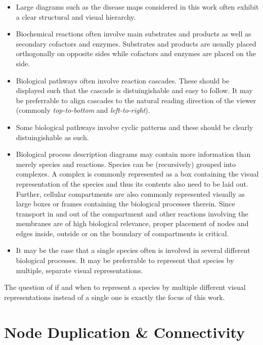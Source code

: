 \documentclass[
	fontsize=10pt, %
	twoside=true, %
	secnumdepth=1, %
  toc=indentunnumbered %
]{kaobook}
\begin{document}
\begin{itemize}
 \item Large diagrams such as the disease maps considered in this work often
   exhibit a clear structural and visual hierarchy.
 \item Biochemical reactions often involve main substrates and products as well
   as secondary cofactors and enzymes. Substrates and products are usually
   placed orthogonally on opposite sides while cofactors and enzymes are
   placed on the side.
 \item Biological pathways often involve reaction cascades. These should be
   displayed such that the cascade is distuingishable and easy to follow.
   It may be preferrable to align cascades to the natural reading direction of
   the viewer (commonly \textit{top-to-bottom} and \textit{left-to-right}).
 \item Some biological pathways involve cyclic patterns and these should be
   clearly distuingishable as such.
\item Biological process description diagrams may contain more information
  than merely species and reactions. Species can be (recursively) grouped
  into complexes. A complex is commonly represented as a box containing the
  visual representation of the species and thus its contents also need to be
  laid out. Further, cellular compartments are also commonly represented
  visually as large boxes or frames containing the biological processes
  therein. Since transport in and out of the compartment and other reactions
  involving the membranes are of high biological relevance, proper placement
  of nodes and edges inside, outside or on the boundary of compartments is critical.
\item It may be the case that a single species often is involved in several
  different biological processes. It may be preferrable to represent that
  species by multiple, separate visual representations.
\end{itemize}

The question of if and when to represent a species by multiple different visual
representations instead of a single one is exactly the focus of this work.


\section{Node Duplication \& Connectivity}
\end{document}
